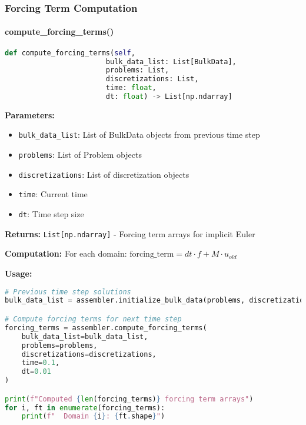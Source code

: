 \subsubsection{Forcing Term Computation}

\paragraph{compute\_forcing\_terms()}\leavevmode
\begin{lstlisting}[language=Python, caption=Compute Forcing Terms Method]
def compute_forcing_terms(self,
                        bulk_data_list: List[BulkData],
                        problems: List,
                        discretizations: List,
                        time: float,
                        dt: float) -> List[np.ndarray]
\end{lstlisting}

\textbf{Parameters:}
\begin{itemize}
    \item \texttt{bulk\_data\_list}: List of BulkData objects from previous time step
    \item \texttt{problems}: List of Problem objects
    \item \texttt{discretizations}: List of discretization objects
    \item \texttt{time}: Current time
    \item \texttt{dt}: Time step size
\end{itemize}

\textbf{Returns:} \texttt{List[np.ndarray]} - Forcing term arrays for implicit Euler

\textbf{Computation:} For each domain: $\text{forcing\_term} = dt \cdot f + M \cdot u_{old}$

\textbf{Usage:}
\begin{lstlisting}[language=Python, caption=Forcing Terms Usage]
# Previous time step solutions
bulk_data_list = assembler.initialize_bulk_data(problems, discretizations, time=0.0)

# Compute forcing terms for next time step
forcing_terms = assembler.compute_forcing_terms(
    bulk_data_list=bulk_data_list,
    problems=problems,
    discretizations=discretizations,
    time=0.1,
    dt=0.01
)

print(f"Computed {len(forcing_terms)} forcing term arrays")
for i, ft in enumerate(forcing_terms):
    print(f"  Domain {i}: {ft.shape}")
\end{lstlisting}

